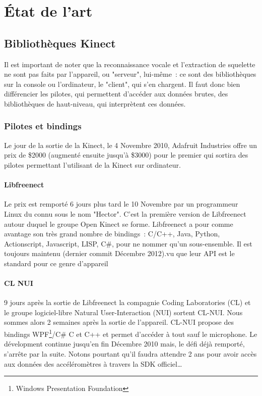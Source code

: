 \documentclass[french,12pt]{report}
\begin{document}
	\chapter{État de l'art}
	
	
  \section{Bibliothèques Kinect}
		
Il est important de noter que la reconnaissance vocale et l'extraction de 
squelette ne sont pas faits par l'appareil, ou "serveur", lui-même~: ce sont des
bibliothèques sur la console ou l'ordinateur, le "client", qui s'en chargent. 
Il faut donc bien
différencier les pilotes, qui permettent d'accéder aux données brutes, des
bibliothèques de haut-niveau, qui interprètent ces données.

  \subsection{Pilotes et bindings}
  Le jour de la sortie de la Kinect, le 4 Novembre 2010, Adafruit Industries 
  offre un prix de \$2000 (augmenté ensuite jusqu'à \$3000) pour le premier qui
  sortira des pilotes permettant l'utilisant de la Kinect sur ordinateur.
  \subsubsection{Libfreenect}
  Le prix est remporté 6 jours plus tard le 10 Novembre par un programmeur Linux
  du connu sous le nom "Hector". C'est la première version de Libfreenect autour
  duquel le groupe Open Kinect se forme. Libfreenect a pour comme avantage son
  très grand nombre de bindings~: C/C++, Java, Python, Actionscript, Javascript,
  LISP, C\#, pour ne nommer qu'un sous-ensemble. 
  Il est toujours maintenu (dernier commit Décembre 2012).vu
  que leur API est le standard pour ce genre d'appareil 
  \subsubsection{CL NUI}
  9 jours après la sortie de Libfreenect la compagnie Coding Laboratories 
  (CL) et le groupe logiciel-libre
  Natural User-Interaction (NUI) sortent CL-NUI. Nous sommes alors 2 semaines 
  après la sortie de l'appareil. CL-NUI propose des bindings 
  WPF\footnote{Windows Presentation Foundation}/C\# C et C++ et permet d'accéder 
  à tout sauf le microphone. Le dévelopment continue jusqu'en fin Décembre 2010 
  mais,
  le défi déjà remporté, s'arrête par la suite. Notons pourtant qu'il faudra 
  attendre 2 ans pour avoir accès aux données des accéléromètres à travers la 
  SDK officiel\ldots
  
\end{document}
